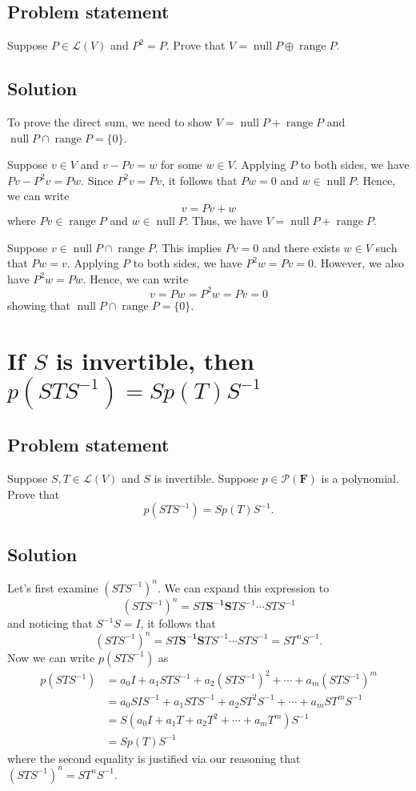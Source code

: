 \documentclass{article}
\begin{document}
\subsection*{Problem statement}
Suppose $P\in\mathcal{L}(V)$ and $P^2=P$. 
Prove that $V=\operatorname{null}P\oplus\operatorname{range}P$.

\subsection*{Solution}
To prove the direct sum, we need to show $V=\operatorname{null}P + \operatorname{range}P$ and $\operatorname{null}P \cap \operatorname{range}P=\{0\}$.

Suppose $v\in V$ and $v-Pv=w$ for some $w\in V$. 
Applying $P$ to both sides, we have $Pv-P^2v=Pw$. 
Since $P^2v=Pv$, it follows that $Pw=0$ and $w\in\operatorname{null}P$. 
Hence, we can write
\[v=Pv+w\]
where $Pv\in\operatorname{range}P$ and $w\in\operatorname{null}P$. 
Thus, we have $V=\operatorname{null}P + \operatorname{range}P$.

Suppose $v\in\operatorname{null}P\cap\operatorname{range}P$. 
This implies $Pv=0$ and there exists $w\in V$ such that $Pw=v$. 
Applying $P$ to both sides, we have $P^2w=Pv=0$. 
However, we also have $P^2w=Pw$. 
Hence, we can write
\[v=Pw=P^2w=Pv=0\]
showing that $\operatorname{null}P \cap \operatorname{range}P=\{0\}$.

\clearpage

\section{If $S$ is invertible, then $p(STS^{-1})=Sp(T)S^{-1}$}
\subsection*{Problem statement}
Suppose $S,T\in\mathcal{L}(V)$ and $S$ is invertible. 
Suppose $p\in\mathcal{P}(\mathbf{F})$ is a polynomial. 
Prove that
\[p(STS^{-1})=Sp(T)S^{-1}.\]

\subsection*{Solution}
Let's first examine $(STS^{-1})^n$. 
We can expand this expression to
\[(STS^{-1})^n=ST\mathbf{S^{-1}S}TS^{-1}\cdots STS^{-1}\]
and noticing that $S^{-1}S=I$, it follows that
\[(STS^{-1})^n=ST\mathbf{S^{-1}S}TS^{-1}\cdots STS^{-1}=ST^nS^{-1}.\]
Now we can write $p(STS^{-1})$ as
\begin{align*}
    p(STS^{-1})&=a_0I+a_1STS^{-1}+a_2(STS^{-1})^2+\cdots+a_m(STS^{-1})^m\\
    &=a_0SIS^{-1}+a_1STS^{-1}+a_2ST^2S^{-1}+\cdots+a_mST^mS^{-1}\\
    &=S(a_0I+a_1T+a_2T^2+\cdots+a_mT^m)S^{-1}\\
    &=Sp(T)S^{-1}
\end{align*}
where the second equality is justified via our reasoning that $(STS^{-1})^n=ST^nS^{-1}$.
\end{document}
